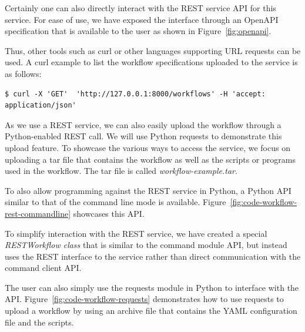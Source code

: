 \documentclass[sigplan,screen]{acmart}
\begin{document}
Certainly one can also directly interact with the REST service API for
this service. For ease of use, we have exposed the interface through
an OpenAPI specification that is available to the user as shown in
Figure~\ref{fig:openapi}.

Thus, other tools such as curl or other languages supporting URL
requests can be used. A curl example to list the workflow
specifications uploaded to the service is as follows:

\begin{verbatim}
$ curl -X 'GET'  'http://127.0.0.1:8000/workflows' -H 'accept: application/json'
\end{verbatim}

As we use a REST service, we can also easily upload the workflow
through a Python-enabled REST call. We will use Python requests to
demonstrate this upload feature. To showcase the various ways to
access the service, we focus on uploading a tar file that contains the
workflow as well as the scripts or programs used in the workflow. The
tar file is called {\em workflow-example.tar}.

To also allow programming against the REST service in Python, a Python
API similar to that of the command line mode is
available. Figure~\ref{fig:code-workflow-rest-commandline} showcases
this API.

To simplify interaction with the REST service, we have created a special
{\em RESTWorkflow class} that is similar to the command module API,
but instead uses the REST interface to the service rather than direct
communication with the command client API.

The user can also simply use the requests module in Python to
interface with the API. Figure~\ref{fig:code-workflow-requests}
demonstrates how to use requests to upload a workflow by using an
archive file that contains the YAML configuration file and the
scripts.
\end{document}
